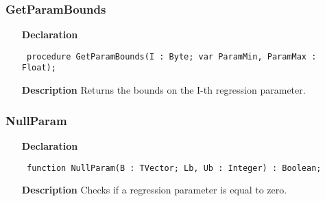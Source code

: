 \documentclass[12pt,a4paper,oneside]{report}
\newcommand{\declarationitem}[1]{\textbf{#1}}
\newcommand{\descriptiontitle}[1]{\textbf{#1}}
\newcommand{\code}[1]{\texttt{#1}}
\begin{document}
\subsubsection{GetParamBounds}
\label{unlfit-GetParamBounds}
\begin{itemize}\item[\declarationitem{Declaration}\hfill]
	\begin{flushleft}
		\code{
			procedure GetParamBounds(I : Byte; var ParamMin, ParamMax : Float);}
		
	\end{flushleft}
	
	\par
	\item[\descriptiontitle{Description}]
	Returns the bounds on the I{-}th regression parameter.
	
\end{itemize}
\subsubsection{NullParam}
\label{unlfit-NullParam}
\begin{itemize}\item[\declarationitem{Declaration}\hfill]
	\begin{flushleft}
		\code{
			function NullParam(B : TVector; Lb, Ub : Integer) : Boolean;}
		
	\end{flushleft}
	
	\par
	\item[\descriptiontitle{Description}]
	Checks if a regression parameter is equal to zero.
	
\end{itemize}
\end{document}
